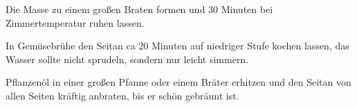 \begin{recipe}
{    \step%
    Die Masse zu einem großen Braten formen und 30 Minuten bei Zimmertemperatur ruhen lassen.
    
    \step%
    In Gemüsebrühe den Seitan ca 20 Minuten auf niedriger Stufe kochen lassen, das Wasser sollte nicht sprudeln, sondern nur leicht simmern.
    
    \step%
    Pflanzenöl in einer großen Pfanne oder einem Bräter erhitzen und den Seitan von allen Seiten kräftig anbraten, bis er schön gebräunt ist.
}


\end{recipe}